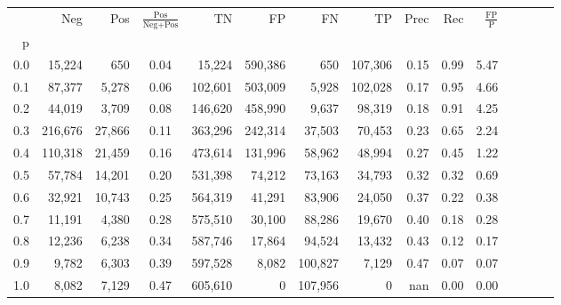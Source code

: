 \begin{tabular}{rrrcrrrrrrrrrrr}
\toprule
{} &      Neg &     Pos & $\frac{\text{Pos}}{\text{Neg}+\text{Pos}}$ &       TN &       FP &       FN &       TP &  Prec &   Rec & $\frac{\text{FP}}{\text{P}}$ \\
p   &          &         &                                            &          &          &          &          &       &       &                              \\
\midrule
0.0 &   15,224 &     650 &                                       0.04 &   15,224 &  590,386 &      650 &  107,306 &  0.15 &  0.99 &                         5.47 \\
0.1 &   87,377 &   5,278 &                                       0.06 &  102,601 &  503,009 &    5,928 &  102,028 &  0.17 &  0.95 &                         4.66 \\
0.2 &   44,019 &   3,709 &                                       0.08 &  146,620 &  458,990 &    9,637 &   98,319 &  0.18 &  0.91 &                         4.25 \\
0.3 &  216,676 &  27,866 &                                       0.11 &  363,296 &  242,314 &   37,503 &   70,453 &  0.23 &  0.65 &                         2.24 \\
0.4 &  110,318 &  21,459 &                                       0.16 &  473,614 &  131,996 &   58,962 &   48,994 &  0.27 &  0.45 &                         1.22 \\
0.5 &   57,784 &  14,201 &                                       0.20 &  531,398 &   74,212 &   73,163 &   34,793 &  0.32 &  0.32 &                         0.69 \\
0.6 &   32,921 &  10,743 &                                       0.25 &  564,319 &   41,291 &   83,906 &   24,050 &  0.37 &  0.22 &                         0.38 \\
0.7 &   11,191 &   4,380 &                                       0.28 &  575,510 &   30,100 &   88,286 &   19,670 &  0.40 &  0.18 &                         0.28 \\
0.8 &   12,236 &   6,238 &                                       0.34 &  587,746 &   17,864 &   94,524 &   13,432 &  0.43 &  0.12 &                         0.17 \\
0.9 &    9,782 &   6,303 &                                       0.39 &  597,528 &    8,082 &  100,827 &    7,129 &  0.47 &  0.07 &                         0.07 \\
1.0 &    8,082 &   7,129 &                                       0.47 &  605,610 &        0 &  107,956 &        0 &   nan &  0.00 &                         0.00 \\
\bottomrule
\end{tabular}
